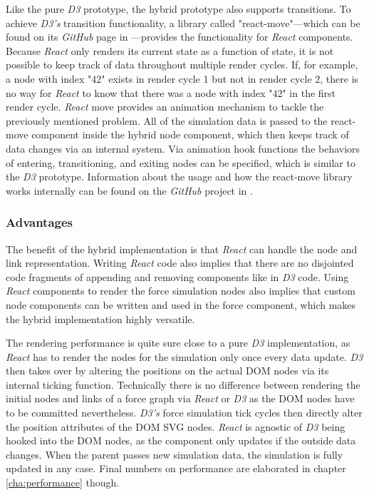 Like the pure \emph{D3} prototype, the hybrid prototype also supports transitions. To achieve \emph{D3's} transition functionality, a library called "react-move"---which can be found on its \emph{GitHub} page in \cite{ReactMove}---provides the functionality for \emph{React} components. Because \emph{React} only renders its current state as a function of state, it is not possible to keep track of data throughout multiple render cycles. If, for example, a node with index "42" exists in render cycle 1 but not in render cycle 2, there is no way for \emph{React} to know that there was a node with index "42" in the first render cycle. \emph{React} move provides an animation mechanism to tackle the previously mentioned problem. All of the simulation data is passed to the react-move component inside the hybrid node component, which then keeps track of data changes via an internal system. Via animation hook functions the behaviors of entering, transitioning, and exiting nodes can be specified, which is similar to the \emph{D3} prototype. Information about the usage and how the react-move library works internally can be found on the \emph{GitHub} project in \cite{ReactMove}.


\subsubsection{Advantages}

The benefit of the hybrid implementation is that \emph{React} can handle the node and link representation. Writing \emph{React} code also implies that there are no disjointed code fragments of appending and removing components like in \emph{D3} code. Using \emph{React} components to render the force simulation nodes also implies that custom node components can be written and used in the force component, which makes the hybrid implementation highly versatile.

The rendering performance is quite sure close to a pure \emph{D3} implementation, as \emph{React} has to render the nodes for the simulation only once every data update. \emph{D3} then takes over by altering the positions on the actual DOM nodes via its internal ticking function. Technically there is no difference between rendering the initial nodes and links of a force graph via \emph{React} or \emph{D3} as the DOM nodes have to be committed nevertheless. \emph{D3's} force simulation tick cycles then directly alter the position attributes of the DOM SVG nodes. \emph{React} is agnostic of \emph{D3} being hooked into the DOM nodes, as the component only updates if the outside data changes. When the parent passes new simulation data, the simulation is fully updated in any case. Final numbers on performance are elaborated in chapter \ref{cha:performance} though.

